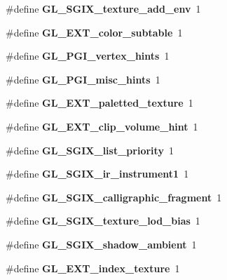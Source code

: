 \begin{DoxyCompactItemize}
\item 
\#define {\bfseries G\+L\+\_\+\+S\+G\+I\+X\+\_\+texture\+\_\+add\+\_\+env}~1\label{_s_d_l__opengl_8h_a5f1d918f8d1a61e60694770ffb89c5e2}

\item 
\#define {\bfseries G\+L\+\_\+\+E\+X\+T\+\_\+color\+\_\+subtable}~1\label{_s_d_l__opengl_8h_a36a4b21eddbee667567ab2a9865bd7b6}

\item 
\#define {\bfseries G\+L\+\_\+\+P\+G\+I\+\_\+vertex\+\_\+hints}~1\label{_s_d_l__opengl_8h_a040b2f714c50e8bbbec509e2647f78b6}

\item 
\#define {\bfseries G\+L\+\_\+\+P\+G\+I\+\_\+misc\+\_\+hints}~1\label{_s_d_l__opengl_8h_aae71305743b00af82af3d6c9e06ea387}

\item 
\#define {\bfseries G\+L\+\_\+\+E\+X\+T\+\_\+paletted\+\_\+texture}~1\label{_s_d_l__opengl_8h_a272edcafa8078f19e6057cc06b183962}

\item 
\#define {\bfseries G\+L\+\_\+\+E\+X\+T\+\_\+clip\+\_\+volume\+\_\+hint}~1\label{_s_d_l__opengl_8h_aeffce098a4a38a3f3a1232f2d51bb176}

\item 
\#define {\bfseries G\+L\+\_\+\+S\+G\+I\+X\+\_\+list\+\_\+priority}~1\label{_s_d_l__opengl_8h_a0f4a24c9dc0f2a49e3af1e0edb8b09ea}

\item 
\#define {\bfseries G\+L\+\_\+\+S\+G\+I\+X\+\_\+ir\+\_\+instrument1}~1\label{_s_d_l__opengl_8h_ab3364bdf527f87d21b1c7c225b7d401c}

\item 
\#define {\bfseries G\+L\+\_\+\+S\+G\+I\+X\+\_\+calligraphic\+\_\+fragment}~1\label{_s_d_l__opengl_8h_a519886f353aa5d898636bc80a9438122}

\item 
\#define {\bfseries G\+L\+\_\+\+S\+G\+I\+X\+\_\+texture\+\_\+lod\+\_\+bias}~1\label{_s_d_l__opengl_8h_a5b179ad4a4c43c2e44ce1c7bb5e7b756}

\item 
\#define {\bfseries G\+L\+\_\+\+S\+G\+I\+X\+\_\+shadow\+\_\+ambient}~1\label{_s_d_l__opengl_8h_a4b45dc6df9775b2179cc9d61d5730ee9}

\item 
\#define {\bfseries G\+L\+\_\+\+E\+X\+T\+\_\+index\+\_\+texture}~1\label{_s_d_l__opengl_8h_a0c4e933348e15138cf57bbaef4c61041}


\end{DoxyCompactItemize}
